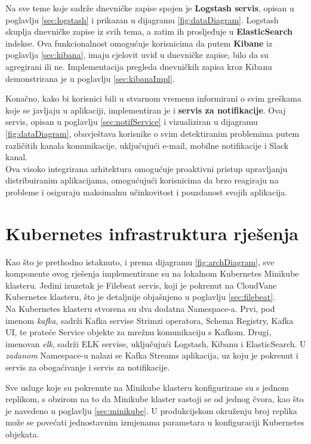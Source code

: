 \documentclass[times, utf8, diplomski]{fer}
\begin{document}
Na sve teme koje sadrže dnevničke zapise spojen je \textbf{Logstash servis}, opisan u poglavlju \ref{sec:logstash} i prikazan u dijagramu \ref{fig:dataDiagram}. Logstash skuplja dnevničke zapise iz svih tema, a zatim ih prosljeđuje u \textbf{ElasticSearch} indekse. Ova funkcionalnost omogućuje korisnicima da putem \textbf{Kibane} iz poglavlja \ref{sec:kibana}, imaju cjelovit uvid u dnevničke zapise, bilo da su agregirani ili ne. Implementacija pregleda dnevničkih zapisa kroz Kibanu demonstrirana je u poglavlju \ref{sec:kibanaImpl}.

Konačno, kako bi korisnici bili u stvarnom vremenu informirani o svim greškama koje se javljaju u aplikaciji, implementiran je i \textbf{servis za notifikacije}. Ovaj servis, opisan u poglavlju \ref{sec:notifService} i vizualiziran u dijagramu \ref{fig:dataDiagram}, obavještava korisnike o svim detektiranim problemima putem različitih kanala komunikacije, uključujući e-mail, mobilne notifikacije i Slack kanal.\\

Ova visoko integrirana arhitektura omogućuje proaktivni pristup upravljanju distribuiranim aplikacijama, omogućujući korisnicima da brzo reagiraju na probleme i osiguraju maksimalnu učinkovitost i pouzdanost svojih aplikacija.


\section{Kubernetes infrastruktura rješenja}
\label{sec:localKubernetes}

Kao što je prethodno istaknuto, i prema dijagramu \ref{fig:archDiagram}, sve komponente ovog rješenja implementirane su na lokalnom Kubernetes Minikube klasteru. Jedini izuzetak je Filebeat servis, koji je pokrenut na CloudVane Kubernetes klasteru, što je detaljnije objašnjeno u poglavlju \ref{sec:filebeat}.\\

Na Kubernetes klasteru stvorena su dva dodatna Namespace-a. Prvi, pod imenom \emph{\glqq kafka\grqq}, sadrži Kafka servise Strimzi operatora, Schema Registry, Kafka UI, te prateće Service objekte za mrežnu komunikaciju s Kafkom. Drugi, imenovan \emph{\glqq elk\grqq}, sadrži ELK servise, uključujući Logstash, Kibanu i ElasticSearch. U \emph{zadanom}  Namespace-u nalazi se Kafka Streams aplikacija, uz koju je pokrenut i servis za obogaćivanje i servis za notifikacije.

Sve usluge koje su pokrenute na Minikube klasteru konfigurirane su s jednom replikom, s obzirom na to da Minikube klaster sastoji se od jednog čvora, kao što je navedeno u poglavlju \ref{sec:minikube}. U produkcijskom okruženju broj replika može se povećati jednostavnim izmjenama parametara u konfiguraciji Kubernetes objekata.\\
\end{document}
